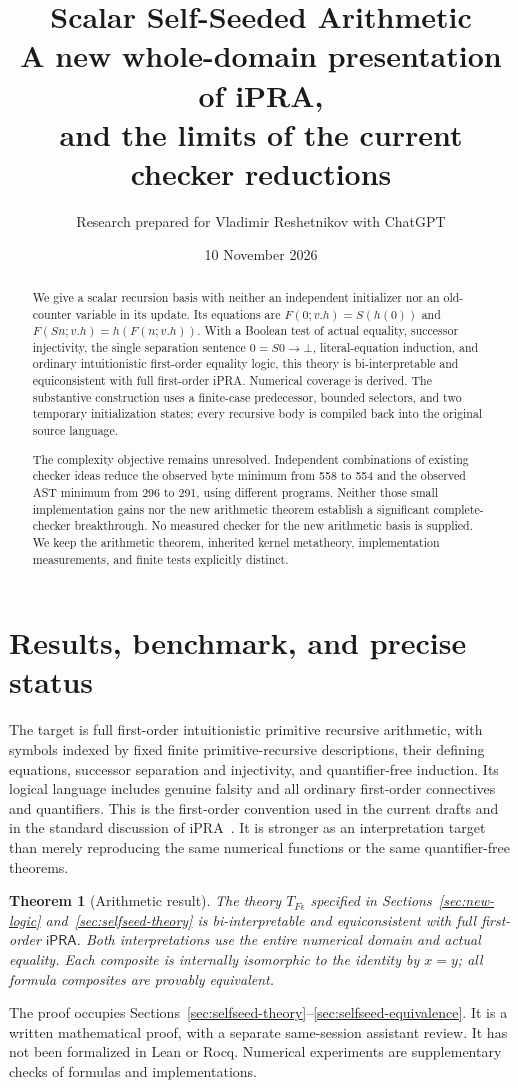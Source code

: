 \documentclass[11pt,letterpaper]{article}
\title{\color{ink}\bfseries Scalar Self-Seeded Arithmetic\\[5pt]
\large A new whole-domain presentation of iPRA,\\and the limits of the current checker reductions}
\author{Research prepared for Vladimir Reshetnikov with ChatGPT}
\date{10 November 2026}
\newtheorem{theorem}{Theorem}[section]
\theoremstyle{definition}\newtheorem{definition}[theorem]{Definition}
\theoremstyle{remark}\newtheorem{remark}[theorem]{Remark}
\newcommand{\ipra}{\mathsf{iPRA}}
\newcommand{\TF}{T_{F\epsilon}}
\begin{document}
\maketitle
\begin{abstract}
We give a scalar recursion basis with neither an independent initializer
nor an old-counter variable in its update. Its equations are
$F(0;v.h)=S(h(0))$ and $F(Sn;v.h)=h(F(n;v.h))$.
With a Boolean test of actual equality, successor injectivity, the single
separation sentence $0=S0\to\bot$, literal-equation induction, and ordinary
intuitionistic first-order equality logic, this theory is bi-interpretable
and equiconsistent with full first-order iPRA. Numerical coverage is
derived. The substantive construction uses a finite-case predecessor,
bounded selectors, and two temporary initialization states; every recursive
body is compiled back into the original source language.

The complexity objective remains unresolved. Independent combinations of
existing checker ideas reduce the observed byte minimum from 558 to 554
and the observed AST minimum from 296 to 291, using different programs.
Neither those small implementation gains nor the new arithmetic theorem
establish a significant complete-checker breakthrough. No measured checker
for the new arithmetic basis is supplied. We keep the arithmetic theorem,
inherited kernel metatheory, implementation measurements, and finite tests
explicitly distinct.
\end{abstract}
\clearpage
\setcounter{tocdepth}{1}
\tableofcontents
\clearpage

\section{Results, benchmark, and precise status}
The target is full first-order intuitionistic primitive recursive
arithmetic, with symbols indexed by fixed finite primitive-recursive
descriptions, their defining equations, successor separation and
injectivity, and quantifier-free induction. Its logical language includes
genuine falsity and all ordinary first-order connectives and quantifiers.
This is the first-order convention used in the current drafts and in the
standard discussion of iPRA~\cite{salehi,avigad}. It is stronger as an
interpretation target than merely reproducing the same numerical
functions or the same quantifier-free theorems.

\begin{theorem}[Arithmetic result]
The theory $\TF$ specified in Sections~\ref{sec:new-logic}
and~\ref{sec:selfseed-theory} is bi-interpretable and equiconsistent with
full first-order $\ipra$. Both interpretations use the entire numerical
domain and actual equality. Each composite is internally isomorphic to
the identity by $x=y$; all formula composites are provably equivalent.
\end{theorem}
The proof occupies Sections~\ref{sec:selfseed-theory}--\ref{sec:selfseed-equivalence}.
It is a written mathematical proof, with a separate same-session
assistant review. It has not been formalized in Lean or Rocq. Numerical
experiments are supplementary checks of formulas and implementations.
\end{document}
